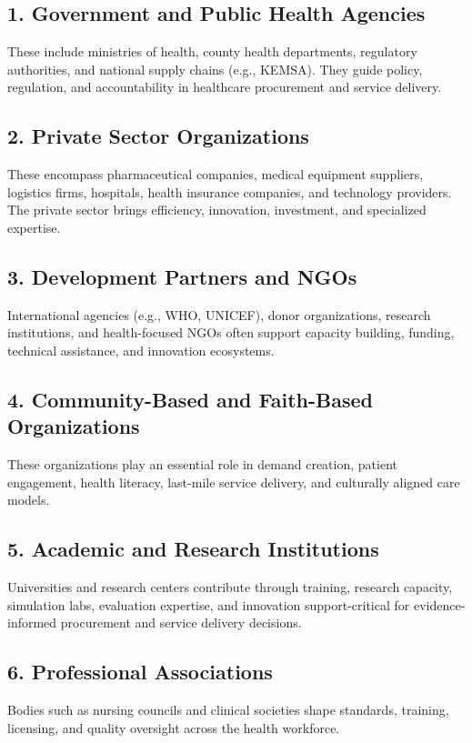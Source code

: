 \documentclass[10pt]{article}
\begin{document}
\subsection*{1. Government and Public Health Agencies}
These include ministries of health, county health departments, regulatory authorities, and national supply chains (e.g., KEMSA). They guide policy, regulation, and accountability in healthcare procurement and service delivery.

\subsection*{2. Private Sector Organizations}
These encompass pharmaceutical companies, medical equipment suppliers, logistics firms, hospitals, health insurance companies, and technology providers. The private sector brings efficiency, innovation, investment, and specialized expertise.

\subsection*{3. Development Partners and NGOs}
International agencies (e.g., WHO, UNICEF), donor organizations, research institutions, and health-focused NGOs often support capacity building, funding, technical assistance, and innovation ecosystems.

\subsection*{4. Community-Based and Faith-Based Organizations}
These organizations play an essential role in demand creation, patient engagement, health literacy, last-mile service delivery, and culturally aligned care models.

\subsection*{5. Academic and Research Institutions}
Universities and research centers contribute through training, research capacity, simulation labs, evaluation expertise, and innovation support-critical for evidence-informed procurement and service delivery decisions.

\subsection*{6. Professional Associations}
Bodies such as nursing councils and clinical societies shape standards, training, licensing, and quality oversight across the health workforce.
\end{document}
